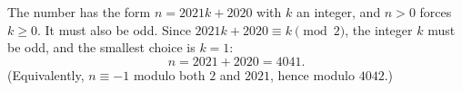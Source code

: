 The number has the form $n=2021k+2020$ with $k$ an integer, and $n>0$ forces $k\ge0$. It must also be odd. Since $2021k+2020\equiv k\pmod2$, the integer $k$ must be odd, and the smallest choice is $k=1$:
\[n=2021+2020=\boxed{4041}.\]
(Equivalently, $n\equiv-1$ modulo both $2$ and $2021$, hence modulo $4042$.)
